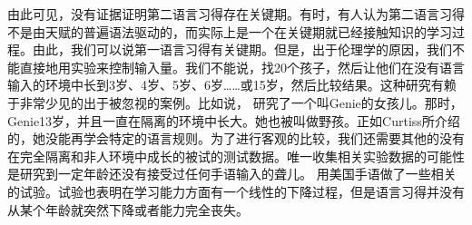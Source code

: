 由此可见，没有证据证明第二语言习得存在关键期。有时，有人认为第二语言习得不是由天赋的普遍语法驱动的，而实际上是一个在关键期就已经接触知识的学习过程\citep[]{Lenneberg67a-u}。由此，我们可以说第一语言习得有关键期。但是，出于伦理学的原因，我们不能直接地用实验来控制输入量。我们不能说，找20个孩子，然后让他们在没有语言输入的环境中长到3岁、4岁、5岁、6岁……或15岁，然后比较结果。这种研究有赖于非常少见的出于被忽视的案例。比如说， \citet{Curtiss77a-u}研究了一个叫Genie的女孩儿。那时，Genie13岁，并且一直在隔离的环境中长大。她也被叫做野孩。正如Curtiss所介绍的，她没能再学会特定的语言规则。为了进行客观的比较，我们还需要其他的没有在完全隔离和非人环境中成长的被试的测试数据。唯一收集相关实验数据的可能性是研究到一定年龄还没有接受过任何手语输入的聋儿。 \citet[]{JN89a}用美国手语做了一些相关的试验。试验也表明在学习能力方面有一个线性的下降过程，但是语言习得并没有从某个年龄就突然下降或者能力完全丧失。

